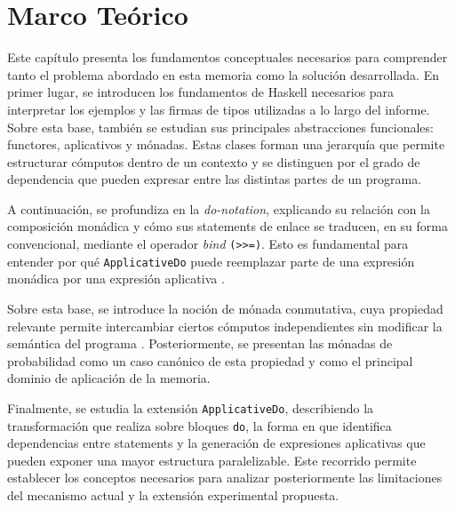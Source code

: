 
\chapter{Marco Teórico}

Este capítulo presenta los fundamentos conceptuales necesarios para comprender tanto el problema abordado en esta memoria como la solución desarrollada. En primer lugar, se introducen los fundamentos de \textsf{Haskell} necesarios para interpretar los ejemplos y las firmas de tipos utilizadas a lo largo del informe. Sobre esta base, también se estudian sus principales abstracciones funcionales: functores, aplicativos y mónadas. Estas clases forman una jerarquía que permite estructurar cómputos dentro de un contexto y se distinguen por el grado de dependencia que pueden expresar entre las distintas partes de un programa.

A continuación, se profundiza en la \textit{do-notation}, explicando su relación con la composición monádica y cómo sus statements de enlace se traducen, en su forma convencional, mediante el operador \textit{bind} \verb|(>>=)|. Esto es fundamental para entender por qué \texttt{ApplicativeDo} puede reemplazar parte de una expresión monádica por una expresión aplicativa \cite{MarlowPJKM2016,GHCApplicativeDo}.

Sobre esta base, se introduce la noción de mónada conmutativa, cuya propiedad relevante permite intercambiar ciertos cómputos independientes sin modificar la semántica del programa \cite{Kock2012,Jacobs2018}. Posteriormente, se presentan las mónadas de probabilidad como un caso canónico de esta propiedad y como el principal dominio de aplicación de la memoria.

Finalmente, se estudia la extensión \texttt{ApplicativeDo}, describiendo la transformación que realiza sobre bloques \texttt{do}, la forma en que identifica dependencias entre statements y la generación de expresiones aplicativas que pueden exponer una mayor estructura paralelizable. Este recorrido permite establecer los conceptos necesarios para analizar posteriormente las limitaciones del mecanismo actual y la extensión experimental propuesta.







